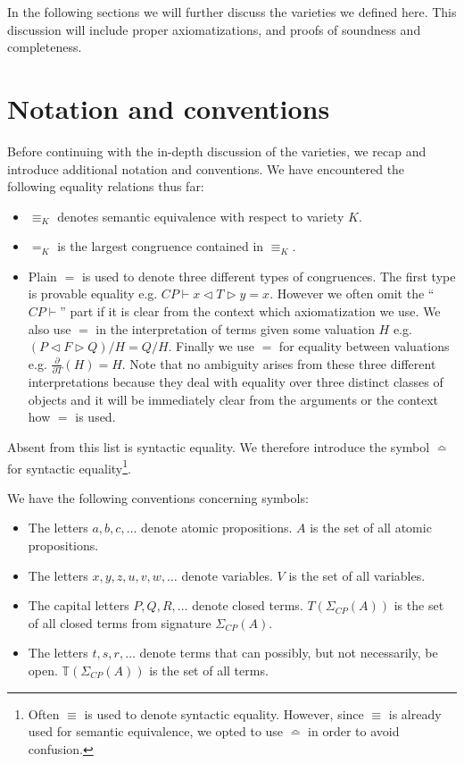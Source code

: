 \documentclass[a4paper,twoside,openright]{report}
\newcommand{\sig}{\ensuremath{\Sigma_{CP}(A)}}
\newcommand{\dd}[1]{\frac{\partial}{\partial #1}}
\newcommand{\syn}{\bumpeq}
\newcommand{\lef}{\ensuremath{\triangleleft}}
\newcommand{\rig}{\ensuremath{\triangleright}}
\begin{document}
In the following sections we will further discuss the varieties we defined here. This discussion will include proper axiomatizations, and proofs of soundness and completeness.

\section{Notation and conventions}
Before continuing with the in-depth discussion of the varieties, we recap and introduce additional notation and conventions. We have encountered the following equality relations thus far:
\begin{itemize}
\item $\equiv_K$ denotes semantic equivalence with respect to variety $K$.
\item $=_K$ is the largest congruence contained in $\equiv_K$.
\item Plain $=$ is used to denote three different types of congruences. The first type is provable equality e.g. $CP\vdash x\lef T\rig y=x$. However we often omit the ``$CP\vdash$'' part if it is clear from the context which axiomatization we use. We also use $=$ in the interpretation of terms given some valuation $H$ e.g. $(P\lef F\rig Q)/H=Q/H$. Finally we use $=$ for equality between valuations e.g. $\dd T(H)=H$. Note that no ambiguity arises from these three different interpretations because they deal with equality over three distinct classes of objects and it will be immediately clear from the arguments or the context how $=$ is used.
\end{itemize}
Absent from this list is syntactic equality. We therefore introduce the symbol $\syn$ for syntactic equality\footnote{Often $\equiv$ is used to denote syntactic equality. However, since $\equiv$ is already used for semantic equivalence, we opted to use $\syn$ in order to avoid confusion.}.

We have the following conventions concerning symbols:
\begin{itemize}
\item The letters $a, b, c, \ldots$ denote atomic propositions. $A$ is the set of all atomic propositions.
\item The letters $x, y, z, u, v, w, \ldots$ denote variables. $V$ is the set of all variables.
\item The capital letters $P, Q, R,\ldots$ denote closed terms. $T(\sig)$ is the set of all closed terms from signature $\sig$.
\item The letters $t, s, r,\ldots$ denote terms that can possibly, but not necessarily, be open. $\mathbb{T}(\sig)$ is the set of all terms.
\end{itemize}
\end{document}
